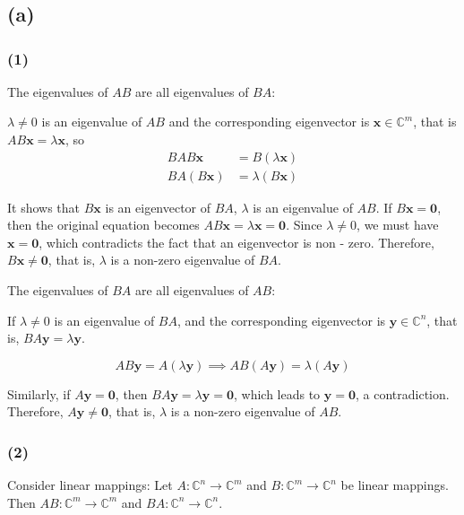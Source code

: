 \documentclass{article}
\begin{document}
\section{}
\subsection*{(a)} 
\subsubsection*{(1)} 
The eigenvalues of $AB$ are all eigenvalues of $BA$:

$\lambda \neq 0 $ is an eigenvalue of $AB$ and the corresponding eigenvector is $\mathbf{x}\in \mathbb{C}^m$, that is $AB\mathbf{x}=\lambda\mathbf{x}$, so
\begin{align*}
	BAB\mathbf{x}&= B (\lambda\mathbf{x})\\
	BA(B\mathbf{x})&=\lambda(B\mathbf{x})
\end{align*}

It shows that $B\mathbf{x}$ is an eigenvector of $BA$, $\lambda  $ is an eigenvalue of $AB$. If $ B\mathbf{x}=\mathbf{0} $, then the original equation becomes $ AB \mathbf{x}=\lambda\mathbf{x}=\mathbf{0} $. Since $ \lambda\neq0 $, we must have $ \mathbf{x}=\mathbf{0} $, which contradicts the fact that an eigenvector is non - zero. Therefore, $ B\mathbf{x}\neq\mathbf{0} $, that is, $ \lambda $ is a non-zero eigenvalue of $ BA $.

The eigenvalues of $BA$ are all eigenvalues of $AB$:

If $ \lambda\neq0 $ is an eigenvalue of $ BA $, and the corresponding eigenvector is $ \mathbf{y}\in\mathbb{C}^n $, that is, $ BA\mathbf{y}=\lambda\mathbf{y} $.

$$
AB\mathbf{y}=A(\lambda\mathbf{y})\implies AB(A\mathbf{y})=\lambda(A\mathbf{y})$$

Similarly, if $ A\mathbf{y}=\mathbf{0} $, then $ BA\mathbf{y}=\lambda\mathbf{y}=\mathbf{0} $, which leads to $ \mathbf{y}=\mathbf{0} $, a contradiction. Therefore, $ A\mathbf{y}\neq\mathbf{0} $, that is, $ \lambda $ is a non-zero eigenvalue of $ AB $.

\subsubsection*{(2)} 

Consider linear mappings: Let $ A:\mathbb{C}^n\to\mathbb{C}^m $ and $ B:\mathbb{C}^m\to\mathbb{C}^n $ be linear mappings. Then $ AB:\mathbb{C}^m\to\mathbb{C}^m $ and $ BA:\mathbb{C}^n\to\mathbb{C}^n $.
\end{document}
